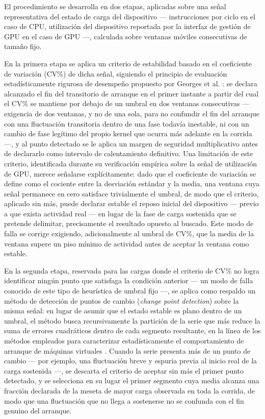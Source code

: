 \documentclass[12pt,oneside,spanish]{book}
\begin{document}
El procedimiento se desarrolla en dos etapas, aplicadas sobre una señal representativa del estado de carga del dispositivo --- instrucciones por ciclo en el caso de CPU, utilización del dispositivo reportada por la interfaz de gestión de GPU en el caso de GPU ---, calculada sobre ventanas móviles consecutivas de tamaño fijo.

En la primera etapa se aplica un criterio de estabilidad basado en el coeficiente de variación (CV\%) de dicha señal, siguiendo el principio de evaluación estadísticamente rigurosa de desempeño propuesto por Georges et al. \cite{Georges2007}: se declara alcanzado el fin del transitorio de arranque en el primer instante a partir del cual el CV\% se mantiene por debajo de un umbral en dos ventanas consecutivas --- exigencia de dos ventanas, y no de una sola, para no confundir el fin del arranque con una fluctuación transitoria dentro de una fase todavía inestable, ni con un cambio de fase legítimo del propio kernel que ocurra más adelante en la corrida ---, y al punto detectado se le aplica un margen de seguridad multiplicativo antes de declararlo como intervalo de calentamiento definitivo. Una limitación de este criterio, identificada durante su verificación empírica sobre la señal de utilización de GPU, merece señalarse explícitamente: dado que el coeficiente de variación se define como el cociente entre la desviación estándar y la media, una ventana cuya señal permanece en cero satisface trivialmente el umbral, de modo que el criterio, aplicado sin más, puede declarar estable el reposo inicial del dispositivo --- previo a que exista actividad real --- en lugar de la fase de carga sostenida que se pretende delimitar, precisamente el resultado opuesto al buscado. Este modo de falla se corrige exigiendo, adicionalmente al umbral de CV\%, que la media de la ventana supere un piso mínimo de actividad antes de aceptar la ventana como estable.

En la segunda etapa, reservada para las cargas donde el criterio de CV\% no logra identificar ningún punto que satisfaga la condición anterior --- un modo de falla conocido de este tipo de heurística de umbral fijo ---, se aplica como respaldo un método de detección de puntos de cambio (\textit{change point detection}) sobre la misma señal: en lugar de asumir que el estado estable es plano dentro de un umbral, el método busca recursivamente la partición de la serie que más reduce la suma de errores cuadráticos dentro de cada segmento resultante, en la línea de los métodos empleados para caracterizar estadísticamente el comportamiento de arranque de máquinas virtuales \cite{Barrett2017}. Cuando la serie presenta más de un punto de cambio --- por ejemplo, una fluctuación breve y espuria previa al inicio real de la carga sostenida ---, se descarta el criterio de aceptar sin más el primer punto detectado, y se selecciona en su lugar el primer segmento cuya media alcanza una fracción declarada de la meseta de mayor carga observada en toda la corrida, de modo que una fluctuación que no llega a sostenerse no se confunda con el fin genuino del arranque.
\end{document}

